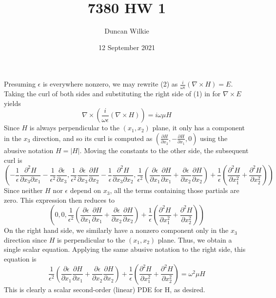 \documentclass{article}
\title{7380 HW 1}
\author{Duncan Wilkie}
\date{12 September 2021}
\begin{document}
\maketitle

\section{}
Presuming $\epsilon$ is everywhere nonzero, we may rewrite (2) as $\frac{i}{\omega\epsilon}\left(\nabla\times H\right) = E$.
Taking the curl of both sides and substituting the right side of (1) in for $\nabla\times E$ yields
\[\nabla\times\left(\frac{i}{\omega\epsilon}\left(\nabla\times H\right)\right) = i\omega\mu H\]
Since $H$ is always perpendicular to the $(x_1,x_2)$ plane, it only has a component in the $x_3$ direction, and so its curl is computed as
$\left(\frac{\partial H}{\partial x_2}, -\frac{\partial H}{\partial x_1}, 0\right)$ using the abusive notation $H=|H|$.
Moving the constants to the other side, the subsequent curl is
\[\left(-\frac{1}{\epsilon}\frac{\partial^2H}{\partial x_3\partial x_1} - \frac{1}{\epsilon^2}\frac{\partial\epsilon}{\partial x_3}, \frac{1}{\epsilon^2}\frac{\partial \epsilon}{\partial x_3}\frac{\partial H}{\partial x_2}-\frac{1}{\epsilon}\frac{\partial^2 H}{\partial x_3\partial x_2}, \frac{1}{\epsilon^2}\left(\frac{\partial\epsilon}{\partial x_1}\frac{\partial H}{\partial x_1}+\frac{\partial \epsilon}{\partial x_2}\frac{\partial H}{\partial x_2}\right)+\frac{1}{\epsilon}\left(\frac{\partial^2 H}{\partial x_1^2}+\frac{\partial^2 H}{\partial x_2^2}\right)\right)\]
Since neither $H$ nor $\epsilon$ depend on $x_3$, all the terms containing those partials are zero. This expression then reduces to \[\left(0, 0, \frac{1}{\epsilon^2}\left(\frac{\partial\epsilon}{\partial x_1}\frac{\partial H}{\partial x_1}+\frac{\partial \epsilon}{\partial x_2}\frac{\partial H}{\partial x_2}\right)+\frac{1}{\epsilon}\left(\frac{\partial^2 H}{\partial x_1^2}+\frac{\partial^2 H}{\partial x_2^2}\right)\right)\]
On the right hand side, we similarly have a nonzero component only in the $x_3$ direction since $H$ is perpendicular to the $(x_1, x_2)$ plane. Thus, we obtain a single scalar equation. Applying the same abusive notation to the right side, this equation is
\[\frac{1}{\epsilon^2}\left(\frac{\partial\epsilon}{\partial x_1}\frac{\partial H}{\partial x_1}+\frac{\partial \epsilon}{\partial x_2}\frac{\partial H}{\partial x_2}\right)+\frac{1}{\epsilon}\left(\frac{\partial^2 H}{\partial x_1^2}+\frac{\partial^2 H}{\partial x_2^2}\right) = \omega^2\mu H\]
This is clearly a scalar second-order (linear) PDE for H, as desired.

\section{}
\end{document}
